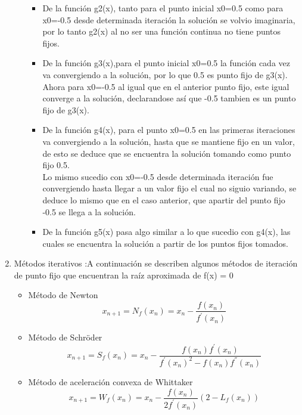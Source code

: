 \documentclass{udparticle}
\begin{document}
\begin{enumerate}
\begin{enumerate}
\begin{itemize}
\item De la función g2(x), tanto para el punto inicial x0=0.5 como para x0=-0.5 desde determinada iteración la solución se volvio imaginaria, por lo tanto g2(x) al no ser una función continua no tiene puntos fijos.
\item De la función g3(x),para el punto inicial x0=0.5 la función cada vez va convergiendo a la solución, por lo que 0.5 es punto fijo de g3(x).\\ Ahora para x0=-0.5 al igual que en el anterior punto fijo, este igual converge a la solución, declarandose así que -0.5 tambien es un punto fijo de g3(x).
\item De la función g4(x), para el punto x0=0.5 en las primeras iteraciones va convergiendo a la solución, hasta que se mantiene fijo en un valor, de esto se deduce que se encuentra la solución tomando como punto fijo 0.5.\\
Lo mismo sucedio con x0=-0.5 desde determinada iteración fue convergiendo hasta llegar a un valor fijo el cual no siguio variando, se deduce lo mismo que en el caso anterior, que apartir del punto fijo -0.5 se llega a la solución.
\item De la función g5(x) pasa algo similar a lo que sucedio con g4(x), las cuales se encuentra la solución a partir de los puntos fijos tomados.
\end{itemize}

\end{enumerate}

\item Métodos iterativos :A continuación se describen algunos métodos de iteración de punto fijo que encuentran la raíz aproximada de f(x) = 0
\begin{itemize}
        \item Método de Newton     
            \begin{equation*}
                 x_{n+1}=N_f(x_n)=x_n -  \frac{f(x_n)}{f^{'}(x_n)}
            \end{equation*}
        
        \item Método de Schröder
            \begin{equation*}
                x_{n+1}=S_f(x_n)=x_n-\frac{f(x_n)f^{'}(x_n)}{f^{'}(x_n)^{2}-f(x_n)f^{''}(x_n)}
            \end{equation*}
        
        \item Método de aceleración convexa de Whittaker
            \begin{equation*}
                x_{n+1}=W_f(x_n)=x_n - \frac{f(x_n)}{2f^{'}(x_n)}(2 - L_f(x_n))
            \end{equation*}
        

\end{itemize}
\end{enumerate}
\end{document}
